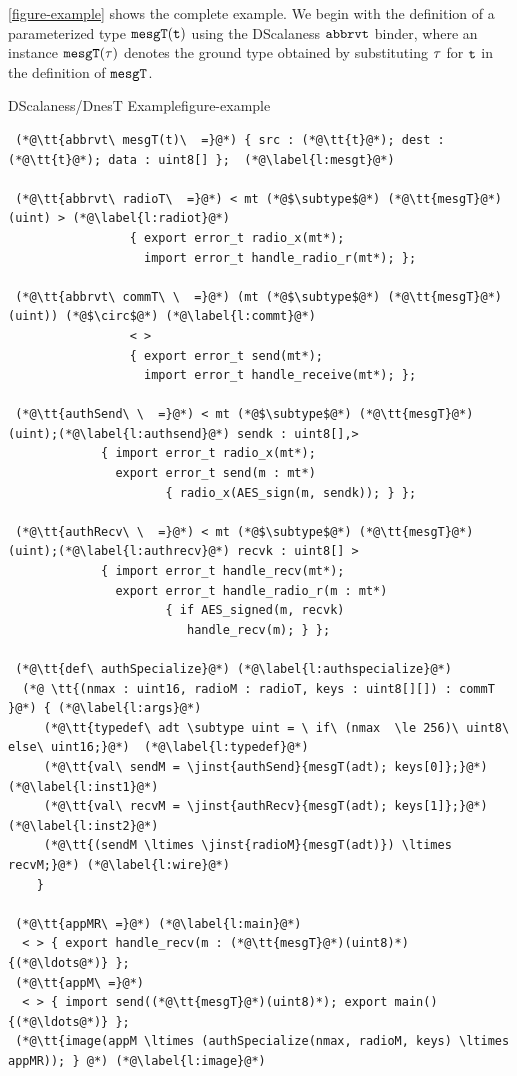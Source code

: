 \autoref{figure-example} shows the complete example. We begin with the definition of a
parameterized type $\tt{mesgT(t)}$ using the DScalaness $\tt{abbrvt}$ binder, where an instance
$\tt{mesgT}(\t)$ denotes the ground type obtained by substituting $\t$ for $\tt{t}$ in the
definition of $\tt{mesgT}$.

\begin{fpfig}[!p]{DScalaness/DnesT Example}{figure-example}
{
\singlespace
\lstset{numbers=left, numberstyle=\tiny, numbersep=0pt, basicstyle=\ttfamily}
\begin{lstlisting}
 (*@\tt{abbrvt\ mesgT(t)\  =}@*) { src : (*@\tt{t}@*); dest : (*@\tt{t}@*); data : uint8[] };  (*@\label{l:mesgt}@*)

 (*@\tt{abbrvt\ radioT\  =}@*) < mt (*@$\subtype$@*) (*@\tt{mesgT}@*)(uint) > (*@\label{l:radiot}@*)
                 { export error_t radio_x(mt*); 
                   import error_t handle_radio_r(mt*); };

 (*@\tt{abbrvt\ commT\ \  =}@*) (mt (*@$\subtype$@*) (*@\tt{mesgT}@*)(uint)) (*@$\circ$@*) (*@\label{l:commt}@*)
                 < >
                 { export error_t send(mt*); 
                   import error_t handle_receive(mt*); };

 (*@\tt{authSend\ \  =}@*) < mt (*@$\subtype$@*) (*@\tt{mesgT}@*)(uint);(*@\label{l:authsend}@*) sendk : uint8[],>  
             { import error_t radio_x(mt*);
               export error_t send(m : mt*) 
                      { radio_x(AES_sign(m, sendk)); } };

 (*@\tt{authRecv\ \  =}@*) < mt (*@$\subtype$@*) (*@\tt{mesgT}@*)(uint);(*@\label{l:authrecv}@*) recvk : uint8[] >  
             { import error_t handle_recv(mt*);
               export error_t handle_radio_r(m : mt*) 
                      { if AES_signed(m, recvk) 
                         handle_recv(m); } }; 

 (*@\tt{def\ authSpecialize}@*) (*@\label{l:authspecialize}@*)
  (*@ \tt{(nmax : uint16, radioM : radioT, keys : uint8[][]) : commT }@*) { (*@\label{l:args}@*)
     (*@\tt{typedef\ adt \subtype uint = \ if\ (nmax  \le 256)\ uint8\ else\ uint16;}@*)  (*@\label{l:typedef}@*) 
     (*@\tt{val\ sendM = \jinst{authSend}{mesgT(adt); keys[0]};}@*)  (*@\label{l:inst1}@*)
     (*@\tt{val\ recvM = \jinst{authRecv}{mesgT(adt); keys[1]};}@*)  (*@\label{l:inst2}@*)    
     (*@\tt{(sendM \ltimes \jinst{radioM}{mesgT(adt)}) \ltimes recvM;}@*) (*@\label{l:wire}@*)
    }

 (*@\tt{appMR\ =}@*) (*@\label{l:main}@*)
  < > { export handle_recv(m : (*@\tt{mesgT}@*)(uint8)*) {(*@\ldots@*)} }; 
 (*@\tt{appM\ =}@*) 
  < > { import send((*@\tt{mesgT}@*)(uint8)*); export main() {(*@\ldots@*)} };  
 (*@\tt{image(appM \ltimes (authSpecialize(nmax, radioM, keys) \ltimes appMR)); } @*) (*@\label{l:image}@*)  
\end{lstlisting}
\primaryspacing
}
\end{fpfig}


